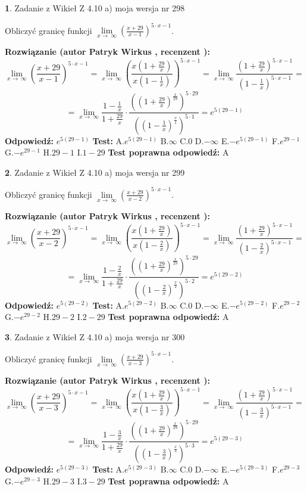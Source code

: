 \documentclass[12pt, a4paper]{article}
\theoremstyle{definition} %
\newtheorem{zad}{}
\newcommand{\zadStart}[1]{\begin{zad}#1\newline}
\newcommand{\zadStop}{\end{zad}}
\newcommand{\rozwStart}[2]{\noindent \textbf{Rozwiązanie (autor #1 , recenzent #2): }\newline}
\newcommand{\rozwStop}{\newline}
\newcommand{\odpStart}{\noindent \textbf{Odpowiedź:}\newline}
\newcommand{\odpStop}{\newline}
\newcommand{\testStart}{\noindent \textbf{Test:}\newline}
\newcommand{\testStop}{\newline}
\newcommand{\kluczStart}{\noindent \textbf{Test poprawna odpowiedź:}\newline}
\newcommand{\kluczStop}{\newline}
\begin{document}
\zadStart{Zadanie z Wikieł Z 4.10 a) moja wersja nr 298}


Obliczyć granicę funkcji  $\lim\limits_{x\to\ \infty}(\frac{x+29}{x-1})^{5\cdot x-1}$.
\zadStop
\rozwStart{Patryk Wirkus}{}
$$\lim\limits_{x\to\ \infty}(\frac{x+29}{x-1})^{5\cdot x-1} = \lim\limits_{x\to\ \infty}(\frac{x(1+\frac{29}{x})}{x(1-\frac{1}{x})})^{5\cdot x-1}=\lim\limits_{x\to\ \infty}\frac{(1+\frac{29}{x})^{5\cdot x-1}}{(1-\frac{1}{x})^{5\cdot x-1}}=$$
$$=\lim\limits_{x\to\ \infty}\frac{1-\frac{1}{x}}{1+\frac{29}{x}}\cdot\frac{((1+\frac{29}{x})^{\frac{x}{29}})^{5\cdot29}}{((1-\frac{1}{x})^{\frac{x}{1}})^{5\cdot1}}=e^{5(29-1)}$$
\rozwStop
\odpStart
$e^{5(29-1)}$
\odpStop
\testStart
A.$e^{5(29-1)}$ B.$\infty$ C.$0$ D.$-\infty$ E.$-e^{5(29-1)}$
F.$e^{29-1}$ G.$-e^{29-1}$
H.$29-1$
I.$1-29$
\testStop
\kluczStart
A
\kluczStop



\zadStart{Zadanie z Wikieł Z 4.10 a) moja wersja nr 299}


Obliczyć granicę funkcji  $\lim\limits_{x\to\ \infty}(\frac{x+29}{x-2})^{5\cdot x-1}$.
\zadStop
\rozwStart{Patryk Wirkus}{}
$$\lim\limits_{x\to\ \infty}(\frac{x+29}{x-2})^{5\cdot x-1} = \lim\limits_{x\to\ \infty}(\frac{x(1+\frac{29}{x})}{x(1-\frac{2}{x})})^{5\cdot x-1}=\lim\limits_{x\to\ \infty}\frac{(1+\frac{29}{x})^{5\cdot x-1}}{(1-\frac{2}{x})^{5\cdot x-1}}=$$
$$=\lim\limits_{x\to\ \infty}\frac{1-\frac{2}{x}}{1+\frac{29}{x}}\cdot\frac{((1+\frac{29}{x})^{\frac{x}{29}})^{5\cdot29}}{((1-\frac{2}{x})^{\frac{x}{2}})^{5\cdot2}}=e^{5(29-2)}$$
\rozwStop
\odpStart
$e^{5(29-2)}$
\odpStop
\testStart
A.$e^{5(29-2)}$ B.$\infty$ C.$0$ D.$-\infty$ E.$-e^{5(29-2)}$
F.$e^{29-2}$ G.$-e^{29-2}$
H.$29-2$
I.$2-29$
\testStop
\kluczStart
A
\kluczStop



\zadStart{Zadanie z Wikieł Z 4.10 a) moja wersja nr 300}


Obliczyć granicę funkcji  $\lim\limits_{x\to\ \infty}(\frac{x+29}{x-3})^{5\cdot x-1}$.
\zadStop
\rozwStart{Patryk Wirkus}{}
$$\lim\limits_{x\to\ \infty}(\frac{x+29}{x-3})^{5\cdot x-1} = \lim\limits_{x\to\ \infty}(\frac{x(1+\frac{29}{x})}{x(1-\frac{3}{x})})^{5\cdot x-1}=\lim\limits_{x\to\ \infty}\frac{(1+\frac{29}{x})^{5\cdot x-1}}{(1-\frac{3}{x})^{5\cdot x-1}}=$$
$$=\lim\limits_{x\to\ \infty}\frac{1-\frac{3}{x}}{1+\frac{29}{x}}\cdot\frac{((1+\frac{29}{x})^{\frac{x}{29}})^{5\cdot29}}{((1-\frac{3}{x})^{\frac{x}{3}})^{5\cdot3}}=e^{5(29-3)}$$
\rozwStop
\odpStart
$e^{5(29-3)}$
\odpStop
\testStart
A.$e^{5(29-3)}$ B.$\infty$ C.$0$ D.$-\infty$ E.$-e^{5(29-3)}$
F.$e^{29-3}$ G.$-e^{29-3}$
H.$29-3$
I.$3-29$
\testStop
\kluczStart
A
\kluczStop
\end{document}
